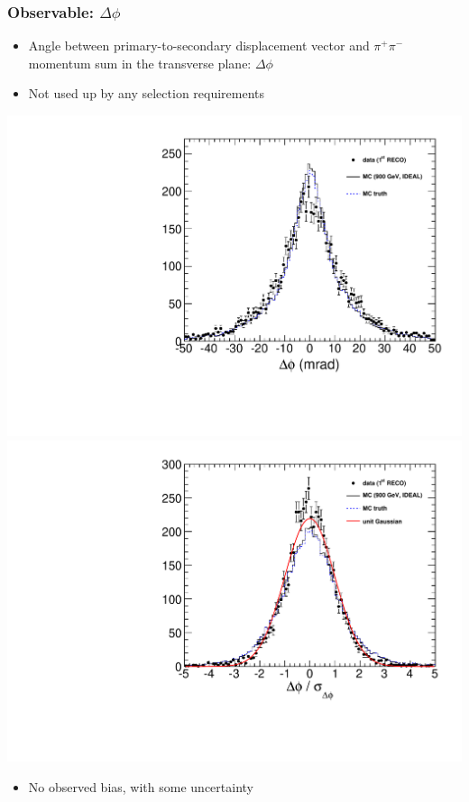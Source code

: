 \documentclass[compress]{beamer}
\begin{document}
\begin{frame}
\frametitle{Observable: $\Delta \phi$}

\begin{itemize}
\item Angle between primary-to-secondary displacement vector and $\pi^+\pi^-$ momentum sum in the transverse plane: $\Delta \phi$

\item Not used up by any selection requirements
\end{itemize}

\includegraphics[width=0.5\linewidth]{kaonTracking2_deltaphi.pdf}
\includegraphics[width=0.5\linewidth]{kaonTracking2_normalized.pdf}

\begin{itemize}
\item No observed bias, with some uncertainty
\end{itemize}
\end{frame}
\end{document}

